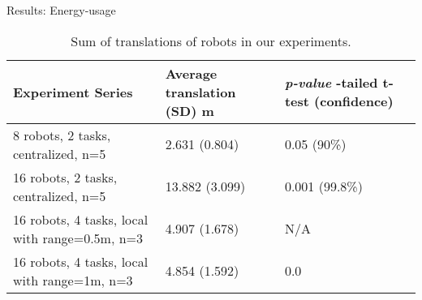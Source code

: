 \documentclass{beamer}
\begin{document}
\begin{frame}[t]{Results: Energy-usage}
\begin{table}
\begin{small}
\begin{center}
\caption{Sum of translations of robots in our experiments.}
\begin{tabular}{|p{1.5in}|m{1in}|m{0.9in}|}
\hline Experiment Series & Average \protect\newline translation \protect\newline(SD) m & \textit{p-value} \protect\newline 1-tailed t-test (confidence)\\ 
\hline \alert{8 robots, 2 tasks, centralized, n=5} & 2.631 (0.804) & 0.05 (90\%)\\ 
\hline \alert{16 robots, 2 tasks, centralized, n=5} & 13.882 (3.099) & \alert{0.001 (99.8\%)}\\
\hline \alert{16 robots, 4 tasks, local  with range=0.5m, n=3} & 4.907 (1.678) & N/A\\
\hline \alert{16 robots, 4 tasks, local  with range=1m, n=3}  & 4.854  (1.592) & 0.0\\
\hline
\end{tabular}
\label{table:motion-cmp} 
\end{center}
\end{small}
\end{table}
\end{frame}
\end{document}
